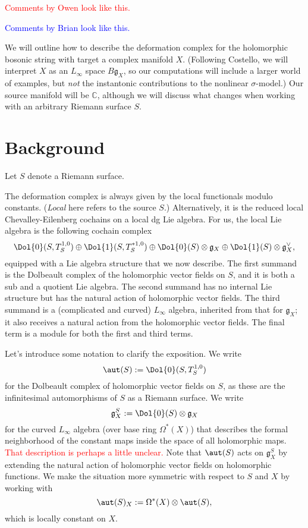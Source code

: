 \documentclass{amsart}
\def\CC{\mathbb C}
\def\fg{\mathfrak g}
\def\ot{\otimes}
\def\owen{\textcolor{red}}
\def\brian{\textcolor{blue}}
\begin{document}
\owen{Comments by Owen look like this.}

\brian{Comments by Brian look like this.}

We will outline how to describe the deformation complex for the holomorphic bosonic string with target a complex manifold $X$. (Following Costello, we will interpret $X$ as an $L_\infty$ space $B\fg_X$, so our computations will include a larger world of examples, but \emph{not} the instantonic contributions to the nonlinear $\sigma$-model.) Our source manifold will be $\CC$, although we will discuss what changes when working with an arbitrary Riemann surface $S$.

\section{Background}

Let $S$ denote a Riemann surface.

The deformation complex is always given by the local functionals modulo constants.  (\emph{Local} here refers to the source $S$.) Alternatively, it is the reduced local Chevalley-Eilenberg cochains on a local dg Lie algebra. For us, the local Lie algebra is the following cochain complex
\[
\Dol{0}(S,T^{1,0}_S) \oplus \Dol{1}(S, T^{\ast 1,0}_S) \oplus \Dol{0}(S) \ot \fg_X \oplus \Dol{1}(S) \ot \fg_X^\vee,
\]
equipped with a Lie algebra structure that we now describe. The first summand is the Dolbeault complex of the holomorphic vector fields on $S$, and it is both a sub and a quotient Lie algebra. The second summand has no internal Lie structure but has the natural action of holomorphic vector fields. The third summand is a (complicated and curved) $L_\infty$ algebra, inherited from that for $\fg_X$; it also receives a natural action from the holomorphic vector fields. The final term is a module for both the first and third terms.

Let's introduce some notation to clarify the exposition. We write
\[
\aut(S) := \Dol{0}(S,T^{1,0}_S)
\]
for the Dolbeault complex of holomorphic vector fields on $S$, as these are the infinitesimal automorphisms of $S$ as a Riemann surface. We write
\[
\fg_X^S := \Dol{0}(S) \ot \fg_X
\]
for the curved $L_\infty$ algebra (over base ring $\Omega^\ast(X)$) that describes the formal neighborhood of the constant maps inside the space of all holomorphic maps. \owen{That description is perhaps a little unclear.} Note that $\aut(S)$ acts on $\fg_X^S$ by extending the natural action of holomorphic vector fields on holomorphic functions. We make the situation more symmetric with respect to $S$ and $X$ by working with 
\[
\aut(S)_X := \Omega^*(X) \otimes \aut(S),
\]
which is locally constant on $X$. 
\end{document}
